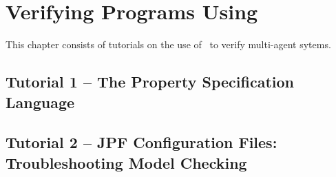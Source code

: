 %
\chapter{Verifying Programs Using \ajpf}
\label{chap:ajpf}

This chapter consists of tutorials on the use of \ajpf\ to verify multi-agent sytems.

\section{Tutorial 1 -- The Property Specification Language}

{
  \let\section\subsection
  \let\subsection\subsubsection
  \let\subsubsection\paragraph

  
  }

\section{Tutorial 2 -- JPF Configuration Files: Troubleshooting Model Checking}

{
  \let\section\subsection
  \let\subsection\subsubsection
  \let\subsubsection\paragraph

  
  }

